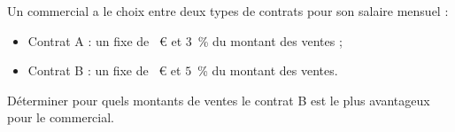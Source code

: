 %
%
%
\begin{exr}
Un commercial a le choix entre deux types de contrats pour son salaire mensuel : 
  \begin{itemize}
  \item Contrat A : un fixe de ~\euro{} et $3$~\% du montant des ventes ;
  \item Contrat B : un fixe de ~\euro{} et $5$~\% du montant des ventes.
  \end{itemize}
Déterminer pour quels montants de ventes le contrat B est le plus avantageux pour le commercial.
\end{exr}